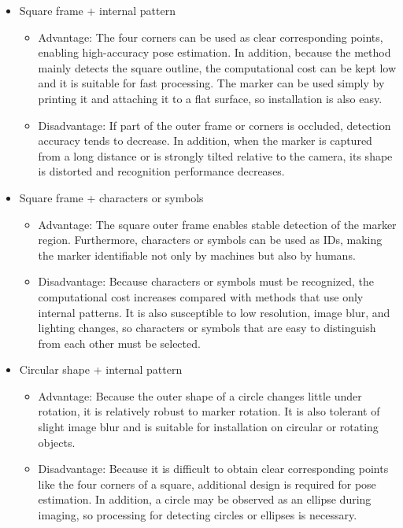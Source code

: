 \documentclass[11pt,a4paper]{article}
\begin{document}
\begin{itemize}
\item Square frame + internal pattern
  \begin{itemize}
  \item Advantage: The four corners can be used as clear corresponding points, enabling high-accuracy pose estimation. In addition, because the method mainly detects the square outline, the computational cost can be kept low and it is suitable for fast processing. The marker can be used simply by printing it and attaching it to a flat surface, so installation is also easy.
  \item Disadvantage: If part of the outer frame or corners is occluded, detection accuracy tends to decrease. In addition, when the marker is captured from a long distance or is strongly tilted relative to the camera, its shape is distorted and recognition performance decreases.
  \end{itemize}
\item Square frame + characters or symbols
  \begin{itemize}
  \item Advantage: The square outer frame enables stable detection of the marker region. Furthermore, characters or symbols can be used as IDs, making the marker identifiable not only by machines but also by humans.
  \item Disadvantage: Because characters or symbols must be recognized, the computational cost increases compared with methods that use only internal patterns. It is also susceptible to low resolution, image blur, and lighting changes, so characters or symbols that are easy to distinguish from each other must be selected.
  \end{itemize}
\item Circular shape + internal pattern
  \begin{itemize}
  \item Advantage: Because the outer shape of a circle changes little under rotation, it is relatively robust to marker rotation. It is also tolerant of slight image blur and is suitable for installation on circular or rotating objects.
  \item Disadvantage: Because it is difficult to obtain clear corresponding points like the four corners of a square, additional design is required for pose estimation. In addition, a circle may be observed as an ellipse during imaging, so processing for detecting circles or ellipses is necessary.
  \end{itemize}
\end{itemize}
\end{document}
